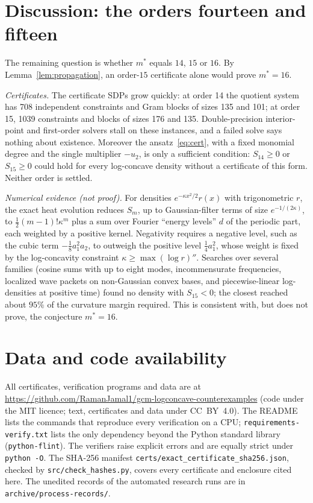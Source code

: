 \documentclass[11pt]{article}
\theoremstyle{definition}
\theoremstyle{remark}
\newcommand{\repo}{\url{https://github.com/RamanJamal1/gcm-logconcave-counterexamples}}
\begin{document}
\section{Discussion: the orders fourteen and fifteen}\label{sec:discussion}
The remaining question is whether $m^*$ equals $14$, $15$ or $16$. By
Lemma~\ref{lem:propagation}, an order-$15$ certificate alone would prove $m^*=16$.

\emph{Certificates.} The certificate SDPs grow quickly: at order 14 the quotient
system has 708 independent constraints and Gram blocks of sizes 135 and 101; at
order 15, 1039 constraints and blocks of sizes 176 and 135. Double-precision
interior-point and first-order solvers stall on these instances, and a failed solve
says nothing about existence. Moreover the ansatz~\eqref{eq:cert}, with a fixed
monomial degree and the single multiplier $-u_2$, is only a sufficient condition:
$S_{14}\ge0$ or $S_{15}\ge0$ could hold for every log-concave density without a
certificate of this form. Neither order is settled.

\emph{Numerical evidence (not proof).} For densities $e^{-\kappa x^2/2}r(x)$ with
trigonometric $r$, the exact heat evolution reduces $S_m$, up to Gaussian-filter
terms of size $e^{-1/(2\kappa)}$, to $\tfrac12(m-1)!\kappa^m$ plus a sum over
Fourier ``energy levels'' $d$ of the periodic part, each weighted by a positive
kernel. Negativity requires a negative level, such as the cubic term
$-\tfrac18a_1^2a_2$, to outweigh the positive level $\tfrac14a_1^2$, whose weight
is fixed by the log-concavity constraint $\kappa\ge\max(\log r)''$. Searches over
several families (cosine sums with up to eight modes, incommensurate frequencies,
localized wave packets on non-Gaussian convex bases, and piecewise-linear
log-densities at positive time) found no density with $S_{15}<0$; the closest
reached about $95\%$ of the curvature margin required. This is consistent with, but
does not prove, the conjecture $m^*=16$.

\section*{Data and code availability}
All certificates, verification programs and data are at \repo{} (code under the MIT
licence; text, certificates and data under CC~BY~4.0). The README lists the commands
that reproduce every verification on a CPU; \texttt{requirements-verify.txt} lists
the only dependency beyond the Python standard library (\texttt{python-flint}). The
verifiers raise explicit errors and are equally strict under \texttt{python -O}. The
SHA-256 manifest \texttt{certs/exact\_certificate\_sha256.json}, checked by
\texttt{src/check\_hashes.py}, covers every certificate and enclosure cited here. The
unedited records of the automated research runs are in
\texttt{archive/process-records/}.
\end{document}
